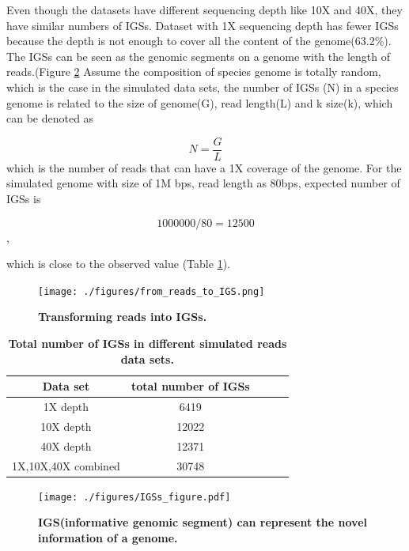 Even though the datasets have different sequencing depth like 10X and 40X, 
they have similar numbers of IGSs. Dataset with 1X sequencing depth has fewer 
IGSs because the depth is not enough to cover all the content of the 
genome(63.2\%). The IGSs can be seen as the
genomic segments on a genome with the length of reads.(Figure \ref{fig:IGS} 
Assume the composition of species 
genome is totally random, which is the case in the simulated data sets, the 
number of IGSs (N) in a species genome is related to the size of genome(G), 
read length(L) and k size(k), which can be denoted as

\[N =\frac{G}{L} \]
which is the number of reads that can have a 1X coverage of the genome.
For the simulated genome with size of 1M bps, read length as 80bps, expected 
number of IGSs is 

\[1000000/80 = 12500 \], 

which is close to the observed value (Table \ref{table:IGSs}).


\begin{figure}[!ht]
\centerline{\texttt{[image: ./figures/from\_reads\_to\_IGS.png]}}
\caption{\bf Transforming reads into IGSs.}
\label{fig:reads_to_IGS}
\end{figure}





\begin{table}[!ht]
\centering
\begin{tabular}{ |c | c |c| c|c| }
\hline 
Data set & total number of IGSs \\
\hline 
1X depth                   & 6419  \\
10X depth                  & 12022  \\
40X depth                  & 12371 \\
1X,10X,40X combined        & 30748 \\
\hline 
\end{tabular}
\caption{
\bf{Total number of IGSs in different simulated reads data sets.}
}
\label{table:IGSs}
\end{table}


\begin{figure}[!ht]
\centerline{\texttt{[image: ./figures/IGSs\_figure.pdf]}}
\caption{\bf IGS(informative genomic segment) can represent the novel information of a genome.}
\label{fig:IGS}
\end{figure}





